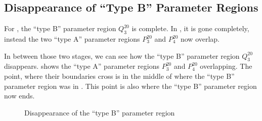 \subsection{Disappearance of ``Type B'' Parameter Regions}
\label{sec:add.change.disb}

For , the ``type B'' parameter region $Q^{20}_3$ is complete.
In , it is gone completely, instead the two ``type A'' parameter regions $P^{20}_3$ and $P^{20}_4$ now overlap.

In between those two stages, we can see how the ``type B'' parameter region $Q^{20}_3$ disappears.
 shows the ``type A'' parameter regions $P^{20}_3$ and $P^{20}_4$ overlapping.
The point, where their boundaries cross is in the middle of where the ``type B'' parameter region was in .
This point is also where the ``type B'' parameter region now ends.

\begin{figure}
	\centering
	\caption{Disappearance of the ``type B'' parameter region}
\end{figure}

